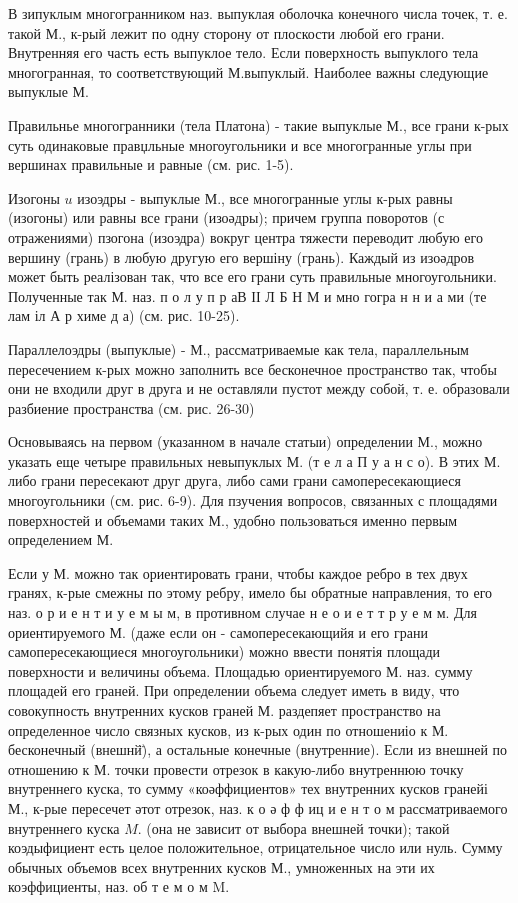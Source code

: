 \documentclass[10pt]{article}
\begin{document}
В зипуклым многогранником наз. выпуклая оболочка конечного числа точек, т. е. такой М., к-рый лежит по одну сторону от плоскости любой его грани. Внутренняя его часть есть выпуклое тело. Если поверхность выпуклого тела многогранная, то соответствующий М.выпуклый. Наиболее важны следующие выпуклые М.



Правильнье многогранники (тела Платона) - такие выпуклые М., все грани к-рых суть одинаковые правџльные многоугольники и все многогранные углы при вершинах правильные и равные (см. рис. 1-5).



Изогоны $u$ изоэдры - выпуклые М., все многогранные углы к-рых равны (изогоны) или равны все грани (изоәдры); причем группа поворотов (с отражениями) пзогона (изоэдра) вокруг центра тяжести переводит любую его вершину (грань) в любую другую его вершіну (грань). Каждый из изоәдров может быть реалізован так, что все его грани суть правильные многоугольники. Полученные так М. наз. п о л у п р аВ ІІ Л Б Н М и мно гогра н н и а ми (те лам іл А р химе д а) (см. рис. 10-25).



Параллелоэдры (выпуклые) - М., рассматриваемые как тела, параллельным пересечением к-рых можно заполнить все бесконечное пространство так, чтобы они не входили друг в друга и не оставляли пустот между собой, т. е. образовали разбиение пространства (см. рис. 26-30)



Основываясь на первом (указанном в начале статыи) определении М., можно указать еще четыре правильных невыпуклых М. (т е л а П у а н с о). В этих М. либо грани пересекают друг друга, либо сами грани самопересекающиеся многоугольники (см. рис. 6-9). Для пзучения вопросов, связанных с площадями поверхностей и объемами таких М., удобно пользоваться именно первым определением М.



Если у М. можно так ориентировать грани, чтобы каждое ребро в тех двух гранях, к-рые смежны по этому ребру, имело бы обратные направления, то его наз. о р и е н т и у е м ы м, в противном случае н е о и е т т р у е м м. Для ориентируемого М. (даже если он - самопересекающийя и его грани самопересекающиеся многоугольники) можно ввести понятія площади поверхности и величины объема. Площадью ориентируемого М. наз. сумму площадей его граней. При определении объема следует иметь в виду, что совокупность внутренних кусков граней М. раздепяет пространство на определенное число связных кусков, из к-рых один по отношениіо к М. бесконечный (внешнй̈), а остальные конечные (внутренние). Если из внешней по отношению к М. точки провести отрезок в какую-либо внутреннюю точку внутреннего куска, то сумму «коәффициентов» тех внутренних кусков гранейі М., к-рые пересечет әтот отрезок, наз. к о ә ф ф иц и е н т о м рассматриваемого внутреннего куска $M$. (она не зависит от выбора внешней точки); такой коэдыфициент есть целое положительное, отрицательное число или нуль. Сумму обычных объемов всех внутренних кусков М., умноженных на эти их коэффициенты, наз. об т е м о м M.
\end{document}
